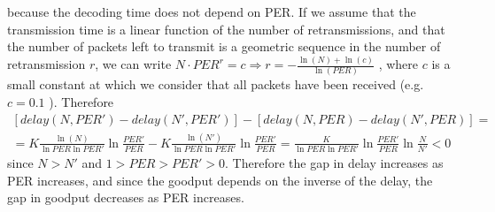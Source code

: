 because the decoding time does not depend on PER. If we assume that the transmission time is a linear function of the number of retransmissions, and that the number of packets left to transmit is a geometric sequence in the number of retransmission $r$, we can write $N\cdot PER^r=c \Rightarrow r=-\frac{\ln(N)+\ln(c)}{\ln(PER)}$ , where $c$ is a small constant at which we consider that all packets have been received (e.g. $c=0.1$ ). Therefore
\begin{equation*}
\begin{split}
[delay(N,PER')-delay(N',PER')]-[delay(N,PER)-delay(N',PER)]=\\ 
=K\frac{\ln(N)}{\ln PER \ln PER'}\ln{\frac{PER'}{PER}}-K\frac{\ln(N')}{\ln PER \ln PER'}\ln{\frac{PER'}{PER}}=\frac{K}{\ln PER \ln PER'}\ln{\frac{PER'}{PER}}\ln{\frac{N}{N'}}<0
\end{split}
\end{equation*}
since $N>N'$ and $1>PER>PER'>0$. Therefore the gap in delay increases as PER increases, and since the goodput depends on the inverse of the delay, the gap in goodput decreases as PER increases.


